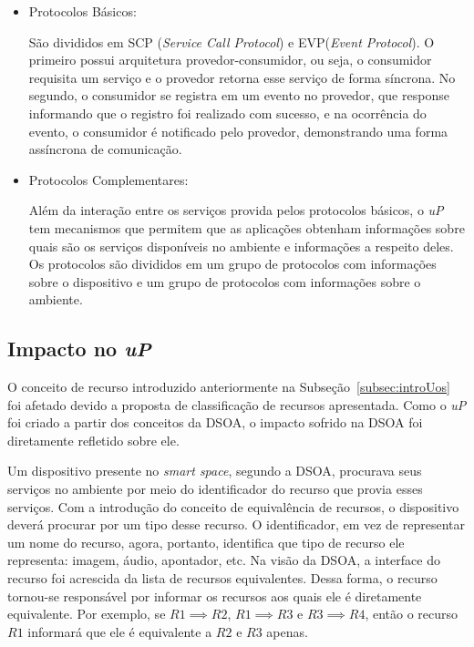 \begin{itemize}
	\item Protocolos Básicos: 

		São divididos em SCP (\emph{Service Call Protocol}) e EVP(\emph{Event Protocol}). O primeiro possui arquitetura provedor-consumidor, ou seja, o consumidor requisita um serviço e o provedor retorna esse serviço de forma síncrona. No segundo, o consumidor se registra em um evento no provedor, que response informando que o registro foi realizado com sucesso, e na ocorrência do evento, o consumidor é notificado pelo provedor, demonstrando uma forma assíncrona de comunicação.
	\item Protocolos Complementares:

		Além da interação entre os serviços provida pelos protocolos básicos, o \emph{uP} tem mecanismos que permitem que as aplicações obtenham informações sobre quais são os serviços disponíveis no ambiente e informações a respeito deles. Os protocolos são divididos em um grupo de protocolos com informações sobre o dispositivo e um grupo de protocolos com informações sobre o ambiente. 
\end{itemize}

\subsection{Impacto no \emph{uP}}

O conceito de recurso introduzido anteriormente na Subseção~\ref{subsec:introUos} foi afetado devido a proposta de classificação de recursos apresentada. Como o \emph{uP} foi criado a partir dos conceitos da DSOA, o impacto sofrido na DSOA foi diretamente refletido sobre ele.

Um dispositivo presente no \emph{smart space}, segundo a DSOA, procurava seus serviços no ambiente por meio do identificador do recurso que provia esses serviços. Com a introdução do conceito de equivalência de recursos, o dispositivo deverá procurar por um tipo desse recurso. O identificador, em vez de representar um nome do recurso, agora, portanto, identifica que tipo de recurso ele representa: imagem, áudio, apontador, etc. Na visão da DSOA, a interface do recurso foi acrescida da lista de recursos equivalentes. Dessa forma, o recurso tornou-se responsável por informar os recursos aos quais ele é diretamente equivalente. Por exemplo, se $R1 \implies R2$, $R1 \implies R3$ e $R3 \implies R4$, então o recurso $R1$ informará que ele é equivalente a $R2$ e $R3$ apenas.

